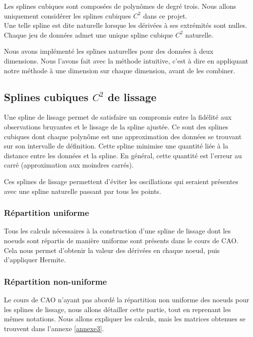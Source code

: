\documentclass[a4paper,12pt]{article} %
\begin{document}
            Les splines cubiques sont composées de polynômes de degré trois. Nous allons uniquement considérer les splines cubiques $C^2$ dans ce projet. \\
            
            Une telle spline est dite naturelle lorsque les dérivées à ses extrémités sont nulles. Chaque jeu de données admet une unique spline cubique $C^2$ naturelle.
            
            Nous avons implémenté les splines naturelles pour des données à deux dimensions. Nous l'avons fait avec la méthode intuitive, c'est à dire en appliquant notre méthode à une dimension sur chaque dimension, avant de les combiner.
            
		\subsection{\label{partie_lissage}Splines cubiques $C^2$ de lissage}
		
		    Une spline de lissage permet de satisfaire un compromis entre la fidélité aux observations bruyantes et le lissage de la spline ajustée. Ce sont des splines cubiques dont chaque polynôme est une approximation des données se trouvant sur son intervalle de définition. Cette spline minimise une quantité liée à la distance entre les données et la spline. En général, cette quantité est l'erreur au carré (approximation aux moindres carrés).
		    
		    Ces splines de lissage permettent d'éviter les oscillations qui seraient présentes avec une spline naturelle passant par tous les points. 

			\subsubsection{Répartition uniforme}
			
                Tous les calculs nécessaires à la construction d'une spline de lissage dont les noeuds sont répartis de manière uniforme sont présents dans le cours de CAO. Cela nous permet d'obtenir la valeur des dérivées en chaque noeud, puis d'appliquer Hermite.
                
            
			\subsubsection{Répartition non-uniforme}
			    
			    Le cours de CAO n'ayant pas abordé la répartition non uniforme des noeuds pour les splines de lissage, nous allons détailler cette partie, tout en reprenant les mêmes notations. Nous allons expliquer les calculs, mais les matrices obtenues se trouvent dans l'annexe \ref{annexe3}.\\
			    
\end{document}
